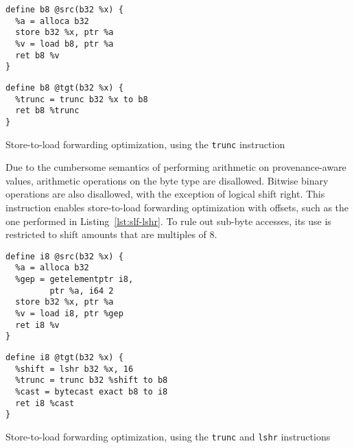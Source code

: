 \documentclass[a4paper,12pt]{article}
\begin{document}
\begin{listing}[h]
  \begin{minipage}{0.45\textwidth}
    \begin{verbatim}
define b8 @src(b32 %x) {
  %a = alloca b32
  store b32 %x, ptr %a
  %v = load b8, ptr %a
  ret b8 %v
}
    \end{verbatim}
  \end{minipage}
  \begin{minipage}{0.45\textwidth}
    \begin{verbatim}
define b8 @tgt(b32 %x) {
  %trunc = trunc b32 %x to b8
  ret b8 %trunc
}
    \end{verbatim}
  \end{minipage}
  \caption{Store-to-load forwarding optimization, using the \texttt{trunc} instruction}
  \label{lst:slf-trunc}
\end{listing}

Due to the cumbersome semantics of performing arithmetic on provenance-aware values, arithmetic operations on the byte type are disallowed.
Bitwise binary operations are also disallowed, with the exception of logical shift right.
This instruction enables store-to-load forwarding optimization with offsets, such as the one performed in Listing~\ref{lst:slf-lshr}.
To rule out sub-byte accesses, its use is restricted to shift amounts that are multiples of 8.

\begin{listing}[h]
  \begin{minipage}{0.45\textwidth}
    \begin{verbatim}
define i8 @src(b32 %x) {
  %a = alloca b32
  %gep = getelementptr i8,
         ptr %a, i64 2
  store b32 %x, ptr %a
  %v = load i8, ptr %gep
  ret i8 %v
}
    \end{verbatim}
  \end{minipage}
  \begin{minipage}{0.45\textwidth}
    \begin{verbatim}
define i8 @tgt(b32 %x) {
  %shift = lshr b32 %x, 16
  %trunc = trunc b32 %shift to b8
  %cast = bytecast exact b8 to i8
  ret i8 %cast
}
    \end{verbatim}
  \end{minipage}
  \caption{Store-to-load forwarding optimization, using the \texttt{trunc} and \texttt{lshr} instructions}
  \label{lst:slf-lshr}
\end{listing}
\end{document}
